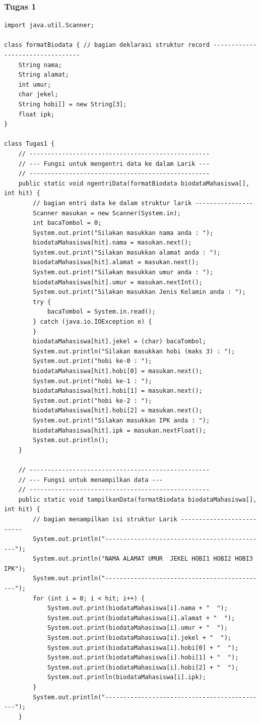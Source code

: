 \documentclass[a4paper,12pt]{article}
\begin{document}
\subsubsection{Tugas 1}
\begin{lstlisting}
import java.util.Scanner;

class formatBiodata { // bagian deklarasi struktur record ---------------------------------
    String nama;
    String alamat;
    int umur;
    char jekel;
    String hobi[] = new String[3];
    float ipk;
}

class Tugas1 {
    // --------------------------------------------------
    // --- Fungsi untuk mengentri data ke dalam Larik ---
    // --------------------------------------------------
    public static void ngentriData(formatBiodata biodataMahasiswa[], int hit) {
        // bagian entri data ke dalam struktur larik ----------------
        Scanner masukan = new Scanner(System.in);
        int bacaTombol = 0;
        System.out.print("Silakan masukkan nama anda : ");
        biodataMahasiswa[hit].nama = masukan.next();
        System.out.print("Silakan masukkan alamat anda : ");
        biodataMahasiswa[hit].alamat = masukan.next();
        System.out.print("Silakan masukkan umur anda : ");
        biodataMahasiswa[hit].umur = masukan.nextInt();
        System.out.print("Silakan masukkan Jenis Kelamin anda : ");
        try {
            bacaTombol = System.in.read();
        } catch (java.io.IOException e) {
        }
        biodataMahasiswa[hit].jekel = (char) bacaTombol;
        System.out.println("Silakan masukkan hobi (maks 3) : ");
        System.out.print("hobi ke-0 : ");
        biodataMahasiswa[hit].hobi[0] = masukan.next();
        System.out.print("hobi ke-1 : ");
        biodataMahasiswa[hit].hobi[1] = masukan.next();
        System.out.print("hobi ke-2 : ");
        biodataMahasiswa[hit].hobi[2] = masukan.next();
        System.out.print("Silakan masukkan IPK anda : ");
        biodataMahasiswa[hit].ipk = masukan.nextFloat();
        System.out.println();
    }

    // --------------------------------------------------
    // --- Fungsi untuk menampilkan data ---
    // --------------------------------------------------
    public static void tampilkanData(formatBiodata biodataMahasiswa[], int hit) {
        // bagian menampilkan isi struktur Larik --------------------------
        System.out.println("---------------------------------------------");
        System.out.println("NAMA ALAMAT UMUR  JEKEL HOBI1 HOBI2 HOBI3 IPK");
        System.out.println("---------------------------------------------");
        for (int i = 0; i < hit; i++) {
            System.out.print(biodataMahasiswa[i].nama + "  ");
            System.out.print(biodataMahasiswa[i].alamat + "  ");
            System.out.print(biodataMahasiswa[i].umur + "  ");
            System.out.print(biodataMahasiswa[i].jekel + "  ");
            System.out.print(biodataMahasiswa[i].hobi[0] + "  ");
            System.out.print(biodataMahasiswa[i].hobi[1] + "  ");
            System.out.print(biodataMahasiswa[i].hobi[2] + "  ");
            System.out.println(biodataMahasiswa[i].ipk);
        }
        System.out.println("---------------------------------------------");
    }


\end{lstlisting}
\end{document}
